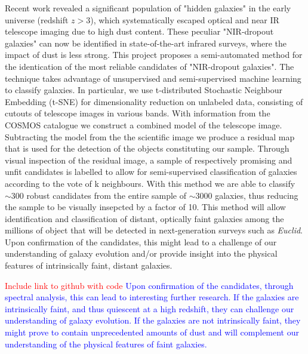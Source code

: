 Recent work revealed a significant population of "hidden galaxies" in the early universe (redshift $z>3$), which systematically escaped optical and near IR telescope imaging due to high dust content. These peculiar "NIR-dropout galaxies" can now be identified in state-of-the-art infrared surveys, where the impact of dust is less strong.
This project proposes a semi-automated method for the identication of the most reliable candidates of "NIR-dropout galaxies". The technique takes advantage of unsupervised and semi-supervised machine learning to classify galaxies. In particular, we use t-distributed Stochastic Neighbour Embedding (t-SNE) for dimensionality reduction on unlabeled data, consisting of cutouts of telescope images in various bands. With information from the COSMOS catalogue we construct a combined model of the telescope image. Subtracting the model from the the scientific image we produce a residual map that is used for the detection of the objects constituting our sample. Through visual inspection of the residual image, a sample of respectively promising and unfit candidates is labelled to allow for semi-supervised classification of galaxies according to the vote of k neighbours. With this method we are able to classify $\sim300$ robust candidates from the entire sample of $\sim3000$ galaxies, thus reducing the sample to be visually insepcted by a factor of 10. This method will allow identification and classification of distant, optically faint galaxies among the millions of object that will be detected in next-generation surveys such as \textit{Euclid}. Upon confirmation of the candidates, this might lead to a challenge of our understanding of galaxy evolution and/or provide insight into the physical features of intrinsically faint, distant galaxies.

\textcolor{red}{Include link to github with code}
\textcolor{blue}{Upon confirmation of the candidates, through spectral analysis, this can lead to interesting further research. If the galaxies are intrinsically faint, and thus quiescent at a high redshift, they can challenge our understanding of galaxy evolution. If the galaxies are not intrinsically faint, they might prove to contain unprecedented amounts of dust and will complement our understanding of the physical features of faint galaxies.}
